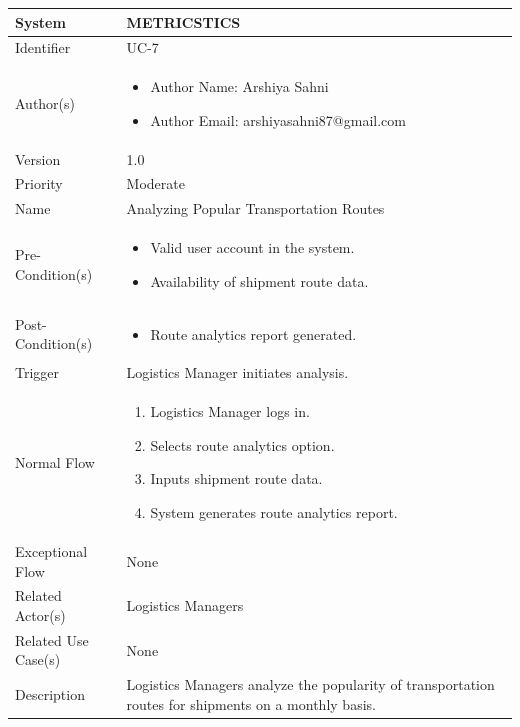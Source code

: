 \begin{center}
	\begin{tabularx}{\textwidth}{|l|X|}
		\hline
		System & METRICSTICS \\
		\hline
		Identifier & UC-7 \\
		\hline
		Author(s) & \begin{itemize}[left=0pt]
			\item Author Name: Arshiya Sahni
			\item Author Email: arshiyasahni87@gmail.com
		\end{itemize} \\
		\hline
		Version & 1.0 \\
		\hline
		Priority & Moderate \\
		\hline
		Name & Analyzing Popular Transportation Routes \\
		\hline
		Pre-Condition(s) &  \begin{itemize}[left=0pt]
			\item Valid user account in the system.
			\item Availability of shipment route data.
		\end{itemize} \\
		\hline
		Post-Condition(s) & \begin{itemize}[left=0pt]
			\item Route analytics report generated.
		\end{itemize} \\
		\hline
		Trigger & Logistics Manager initiates analysis. \\
		\hline
		Normal Flow & \begin{enumerate}[left=0pt]
			\item Logistics Manager logs in.
			\item Selects route analytics option.
			\item Inputs shipment route data.
			\item System generates route analytics report.
		\end{enumerate} \\
		\hline
		Exceptional Flow & None \\
		\hline
		Related Actor(s) & Logistics Managers \\
		\hline
		Related Use Case(s) & None \\
		\hline
		Description & Logistics Managers analyze the popularity of transportation routes for shipments on a monthly basis. \\
		\hline
	\end{tabularx}
\end{center}

